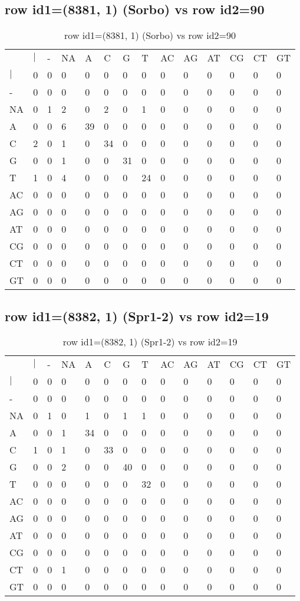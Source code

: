 \subsection{row id1=(8381, 1) (Sorbo) vs row id2=90}
\begin{center}
\begin{longtable}{|l|l|l|l|l|l|l|l|l|l|l|l|l|l|}
\caption{row id1=(8381, 1) (Sorbo) vs row id2=90} \label{table_dm422}\\
\hline
\\
\hline
&$|$&-&NA&A&C&G&T&AC&AG&AT&CG&CT&GT\\
$|$&0&0&0&0&0&0&0&0&0&0&0&0&0\\
-&0&0&0&0&0&0&0&0&0&0&0&0&0\\
NA&0&1&2&0&2&0&1&0&0&0&0&0&0\\
A&0&0&6&39&0&0&0&0&0&0&0&0&0\\
C&2&0&1&0&34&0&0&0&0&0&0&0&0\\
G&0&0&1&0&0&31&0&0&0&0&0&0&0\\
T&1&0&4&0&0&0&24&0&0&0&0&0&0\\
AC&0&0&0&0&0&0&0&0&0&0&0&0&0\\
AG&0&0&0&0&0&0&0&0&0&0&0&0&0\\
AT&0&0&0&0&0&0&0&0&0&0&0&0&0\\
CG&0&0&0&0&0&0&0&0&0&0&0&0&0\\
CT&0&0&0&0&0&0&0&0&0&0&0&0&0\\
GT&0&0&0&0&0&0&0&0&0&0&0&0&0\\
\hline
\end{longtable}
\end{center}

\subsection{row id1=(8382, 1) (Spr1-2) vs row id2=19}
\begin{center}
\begin{longtable}{|l|l|l|l|l|l|l|l|l|l|l|l|l|l|}
\caption{row id1=(8382, 1) (Spr1-2) vs row id2=19} \label{table_dm424}\\
\hline
\\
\hline
&$|$&-&NA&A&C&G&T&AC&AG&AT&CG&CT&GT\\
$|$&0&0&0&0&0&0&0&0&0&0&0&0&0\\
-&0&0&0&0&0&0&0&0&0&0&0&0&0\\
NA&0&1&0&1&0&1&1&0&0&0&0&0&0\\
A&0&0&1&34&0&0&0&0&0&0&0&0&0\\
C&1&0&1&0&33&0&0&0&0&0&0&0&0\\
G&0&0&2&0&0&40&0&0&0&0&0&0&0\\
T&0&0&0&0&0&0&32&0&0&0&0&0&0\\
AC&0&0&0&0&0&0&0&0&0&0&0&0&0\\
AG&0&0&0&0&0&0&0&0&0&0&0&0&0\\
AT&0&0&0&0&0&0&0&0&0&0&0&0&0\\
CG&0&0&0&0&0&0&0&0&0&0&0&0&0\\
CT&0&0&1&0&0&0&0&0&0&0&0&0&0\\
GT&0&0&0&0&0&0&0&0&0&0&0&0&0\\
\hline
\end{longtable}
\end{center}

